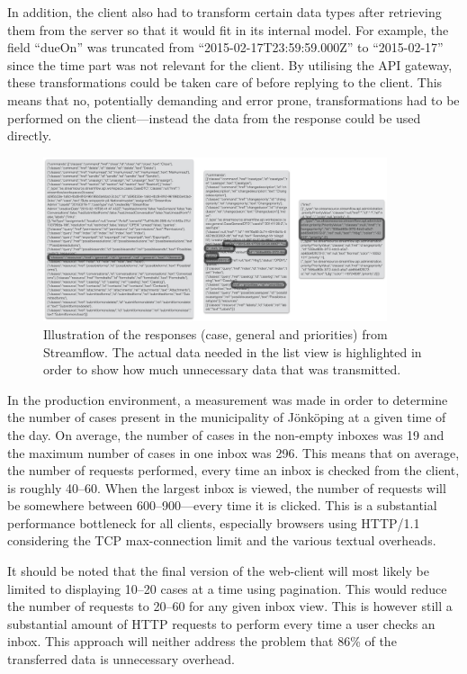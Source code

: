 \documentclass{cslthse-msc}
\begin{document}
In addition, the client also had to transform certain data types after retrieving them from the server so that it would fit in its internal model. For example, the field \enquote{dueOn} was truncated from \enquote{2015-02-17T23:59:59.000Z} to \enquote{2015-02-17} since the time part was not relevant for the client. By utilising the API gateway, these transformations could be taken care of before replying to the client. This means that no, potentially demanding and error prone, transformations had to be performed on the client---instead the data from the response could be used directly.

\begin{figure}[H]
  \centering
    \begin{center}
      \includegraphics[width=0.9\textwidth]{images/streamflow_response.png}
    \end{center}
  \caption{Illustration of the responses (case, general and priorities) from Streamflow. The actual data needed in the list view is highlighted in order to show how much unnecessary data that was transmitted.}
\end{figure}

In the production environment, a measurement was made in order to determine the number of cases present in the municipality of Jönköping at a given time of the day. On average, the number of cases in the non-empty inboxes was 19 and the maximum number of cases in one inbox was 296. This means that on average, the number of requests performed, every time an inbox is checked from the client, is roughly 40--60. When the largest inbox is viewed, the number of requests will be somewhere between 600--900---every time it is clicked. This is a substantial performance bottleneck for all clients, especially browsers using HTTP/1.1 considering the TCP max-connection limit and the various textual overheads.

It should be noted that the final version of the web-client will most likely be limited to displaying 10--20 cases at a time using pagination. This would reduce the number of requests to 20--60 for any given inbox view. This is however still a substantial amount of HTTP requests to perform every time a user checks an inbox. This approach will neither address the problem that 86\% of the transferred data is unnecessary overhead.
\end{document}
